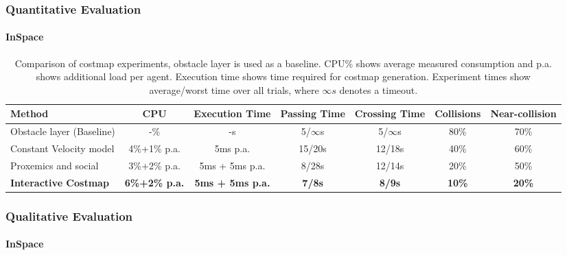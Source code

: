 \begin{frame}
	\frametitle{Quantitative Evaluation}
	\framesubtitle{InSpace}
	
	\begin{table}
		\centering
		\caption{Comparison of costmap experiments, obstacle layer is used as a baseline. CPU\% shows
				 average measured consumption and p.a. shows additional load per agent. Execution time
				 shows time required for costmap generation. Experiment times show average/worst time
				 over all trials, where $\infty s$ denotes a timeout.}
		\def\arraystretch{1.3}
		\vspace{-0.3cm}
		\resizebox{\textwidth}{!}
		{
			\begin{tabular}{lcccccc}
				Method & CPU & Execution Time & Passing Time & Crossing Time & Collisions &
				Near-collision \\ \hline
				Obstacle layer (Baseline) & -\% & -s & 5/$\infty$s & 5/$\infty$s & 80\% & 70\% \\
				Constant Velocity model & 4\%+1\% p.a. & 5ms p.a. & 15/20s & 12/18s & 40\% & 60\% \\
				Proxemics and social & 3\%+2\% p.a. & 5ms + 5ms p.a. & 8/28s & 12/14s & 20\% & 50\% \\
				\textbf{Interactive Costmap} & \textbf{6\%+2\% p.a.} & \textbf{5ms + 5ms p.a.} &
				\textbf{7/8s} & \textbf{8/9s} & \textbf{10\%} &  \textbf{20\%}  \\
			\end{tabular}
		}
	\end{table}
\end{frame}

\begin{frame}
	\frametitle{Qualitative Evaluation}
	\framesubtitle{InSpace}
	
	\begin{figure}[!h]
		\centering
	\end{figure}
\end{frame}
